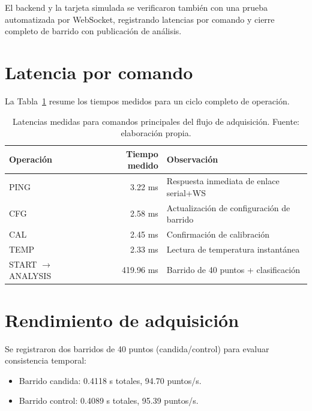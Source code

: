 \documentclass[11pt,a4paper,spanish]{book}
\begin{document}
El backend y la tarjeta simulada se verificaron tambi\'{e}n con una prueba automatizada por WebSocket, registrando latencias por comando y cierre completo de barrido con publicaci\'{o}n de an\'{a}lisis.

\section{Latencia por comando}

La Tabla~\ref{tab:latencias-fase3} resume los tiempos medidos para un ciclo completo de operaci\'{o}n.

\begin{table}[ht]
	\centering
	\begin{tabular}{l r l}
		\hline\hline
		Operaci\'{o}n                & Tiempo medido & Observaci\'{o}n                                   \\ [0.5ex]
		\hline
		PING                         & 3.22 ms       & Respuesta inmediata de enlace serial+WS           \\
		CFG                          & 2.58 ms       & Actualizaci\'{o}n de configuraci\'{o}n de barrido \\
		CAL                          & 2.45 ms       & Confirmaci\'{o}n de calibraci\'{o}n               \\
		TEMP                         & 2.33 ms       & Lectura de temperatura instant\'{a}nea            \\
		START $\rightarrow$ ANALYSIS & 419.96 ms     & Barrido de 40 puntos + clasificaci\'{o}n          \\
		\hline
	\end{tabular}
	\caption[Latencias medidas del protocolo]{Latencias medidas para comandos principales del flujo de adquisici\'{o}n. Fuente: elaboraci\'{o}n propia.}
	\label{tab:latencias-fase3}
\end{table}

\section{Rendimiento de adquisici\'{o}n}

Se registraron dos barridos de 40 puntos (candida/control) para evaluar consistencia temporal:
\begin{itemize}
	\item Barrido candida: 0.4118 s totales, 94.70 puntos/s.
	\item Barrido control: 0.4089 s totales, 95.39 puntos/s.
\end{itemize}
\end{document}
